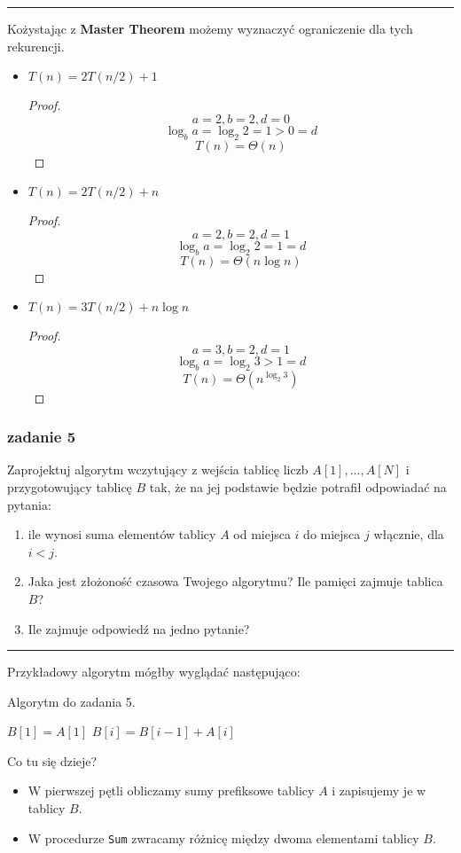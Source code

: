 \documentclass[11pt,a4paper]{article}
\begin{document}
\bigskip
\hrule
\bigskip

Kożystając z \textbf{Master Theorem} możemy wyznaczyć ograniczenie dla tych rekurencji.
\begin{itemize}
    \item $T(n) = 2T(n/2) + 1$
        \begin{proof}
            \[
                a = 2, b = 2, d = 0
            \]
            \[
                \log_b a = \log_2 2 = 1 > 0 = d
            \]
            \[
                T(n) = \Theta(n)
            \]
        \end{proof}
    \item $T(n) = 2T(n/2) + n$
        \begin{proof}
            \[
                a = 2, b = 2, d = 1
            \]
            \[
                \log_b a = \log_2 2 = 1 = d
            \]
            \[
                T(n) = \Theta(n \log n)
            \]
        \end{proof}
    \item $T(n) = 3T(n/2) + n \log n$
        \begin{proof}
            \[
                a = 3, b = 2, d = 1
            \]
            \[
                \log_b a = \log_2 3 > 1 = d
            \]
            \[
                T(n) = \Theta(n^{\log_2 3})
            \]
        \end{proof}
\end{itemize}

\subsubsection{zadanie 5}
Zaprojektuj algorytm wczytujący z wejścia tablicę liczb $A[1], \ldots, A[N]$ i przygotowujący tablicę $B$ tak, że na jej podstawie będzie potrafił odpowiadać na pytania:
\begin{enumerate}
    \item ile wynosi suma elementów tablicy $A$ od miejsca $i$ do miejsca $j$ włącznie, dla $i < j$.
    \item Jaka jest złożoność czasowa Twojego algorytmu? Ile pamięci zajmuje tablica $B$?
    \item Ile zajmuje odpowiedź na jedno pytanie?
\end{enumerate}

\bigskip
\hrule
\bigskip

Przykładowy algorytm mógłby wyglądać następująco:
\begin{algorithm}
    \caption{Algorytm do zadania 5.}
    \begin{algorithmic}[1]
        \State $B[1] = A[1]$
            \State $B[i] = B[i-1] + A[i]$
        \EndFor
            \State {}
        \EndProcedure
    \end{algorithmic}
\end{algorithm}

Co tu się dzieje?
\begin{itemize}
    \item W pierwszej pętli obliczamy sumy prefiksowe tablicy $A$ i zapisujemy je w tablicy $B$.
    \item W procedurze \texttt{Sum} zwracamy różnicę między dwoma elementami tablicy $B$.
\end{itemize}
\end{document}
